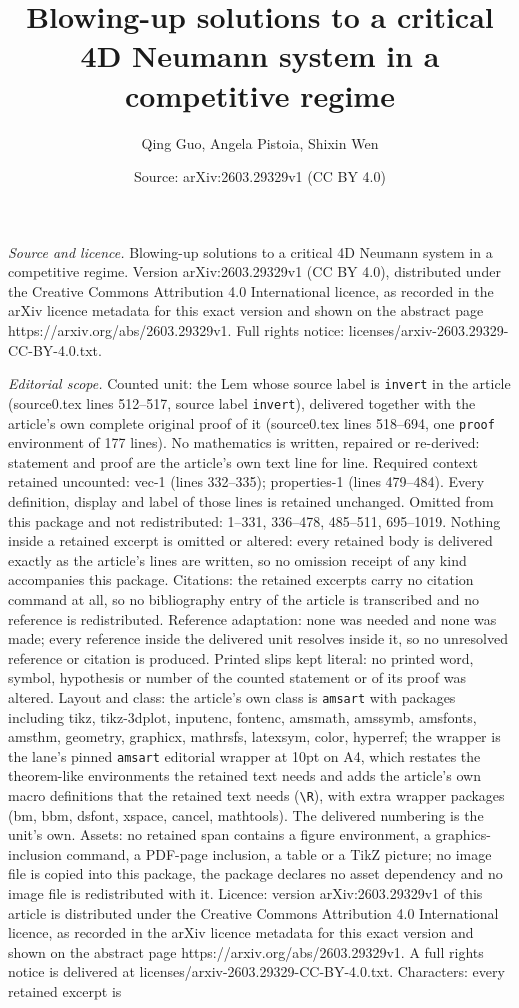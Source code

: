 \documentclass[10pt,a4paper]{amsart}
\title[Blowing-up solutions to a critical 4D Neumann system in a co]{Blowing-up solutions to a critical 4D Neumann system in a competitive regime}
\author{Qing Guo, Angela Pistoia, Shixin Wen}
\date{Source: arXiv:2603.29329v1 (CC BY 4.0)}
\begin{document}
\maketitle

\noindent\emph{Source and licence.} Blowing-up solutions to a critical 4D Neumann system in a competitive regime. Version arXiv:2603.29329v1 (CC BY 4.0), distributed under the Creative Commons Attribution 4.0 International licence, as recorded in the arXiv licence metadata for this exact version and shown on the abstract page https://arxiv.org/abs/2603.29329v1. Full rights notice: licenses/arxiv-2603.29329-CC-BY-4.0.txt.\par\smallskip

\noindent\textit{Editorial scope.} Counted unit: the Lem whose source label is \texttt{invert} in the article (source0.tex lines 512--517, source label \texttt{invert}), delivered together with the article's own complete original proof of it (source0.tex lines 518--694, one \texttt{proof} environment of 177 lines). No mathematics is written, repaired or re-derived: statement and proof are the article's own text line for line. Required context retained uncounted: vec-1 (lines 332--335); properties-1 (lines 479--484). Every definition, display and label of those lines is retained unchanged. Omitted from this package and not redistributed: 1--331, 336--478, 485--511, 695--1019. Nothing inside a retained excerpt is omitted or altered: every retained body is delivered exactly as the article's lines are written, so no omission receipt of any kind accompanies this package. Citations: the retained excerpts carry no citation command at all, so no bibliography entry of the article is transcribed and no reference is redistributed. Reference adaptation: none was needed and none was made; every reference inside the delivered unit resolves inside it, so no unresolved reference or citation is produced. Printed slips kept literal: no printed word, symbol, hypothesis or number of the counted statement or of its proof was altered. Layout and class: the article's own class is \texttt{amsart} with packages including tikz, tikz-3dplot, inputenc, fontenc, amsmath, amssymb, amsfonts, amsthm, geometry, graphicx, mathrsfs, latexsym, color, hyperref; the wrapper is the lane's pinned \texttt{amsart} editorial wrapper at 10pt on A4, which restates the theorem-like environments the retained text needs and adds the article's own macro definitions that the retained text needs (\texttt{\textbackslash R}), with extra wrapper packages (bm, bbm, dsfont, xspace, cancel, mathtools). The delivered numbering is the unit's own. Assets: no retained span contains a figure environment, a graphics-inclusion command, a PDF-page inclusion, a table or a TikZ picture; no image file is copied into this package, the package declares no asset dependency and no image file is redistributed with it. Licence: version arXiv:2603.29329v1 of this article is distributed under the Creative Commons Attribution 4.0 International licence, as recorded in the arXiv licence metadata for this exact version and shown on the abstract page https://arxiv.org/abs/2603.29329v1. A full rights notice is delivered at licenses/arxiv-2603.29329-CC-BY-4.0.txt. Characters: every retained excerpt is 
\end{document}
